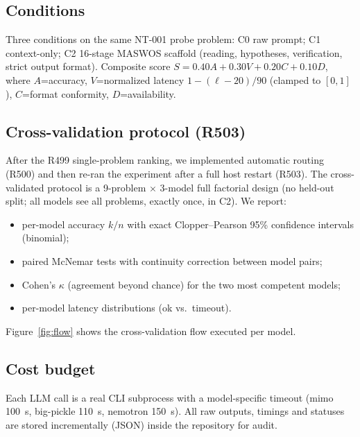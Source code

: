 \subsection{Conditions}
\label{sec:conditions}
Three conditions on the same NT-001 probe problem:
C0 raw prompt; C1 context-only; C2 16-stage MASWOS scaffold (reading,
hypotheses, verification, strict output format). Composite score
$S = 0.40A + 0.30V + 0.20C + 0.10D$, where $A$=accuracy, $V$=normalized
latency $1-(\ell-20)/90$ (clamped to $[0,1]$), $C$=format conformity,
$D$=availability.

\subsection{Cross-validation protocol (R503)}
\label{sec:crossval}
After the R499 single-problem ranking, we implemented automatic routing
(R500) and then re-ran the experiment after a full host restart (R503).
The cross-validated protocol is a 9-problem $\times$ 3-model full factorial
design (no held-out split; all models see all problems, exactly once, in C2).
We report:
\begin{itemize}
  \item per-model accuracy $k/n$ with exact Clopper--Pearson 95\% confidence
  intervals (binomial);
  \item paired McNemar tests with continuity correction between model pairs;
  \item Cohen's $\kappa$ (agreement beyond chance) for the two most
  competent models;
  \item per-model latency distributions (ok vs.\ timeout).
\end{itemize}
Figure~\ref{fig:flow} shows the cross-validation flow executed per model.



\subsection{Cost budget}
Each LLM call is a real CLI subprocess with a model-specific timeout
(mimo 100~s, big-pickle 110~s, nemotron 150~s). All raw outputs, timings and
statuses are stored incrementally (JSON) inside the repository for audit.